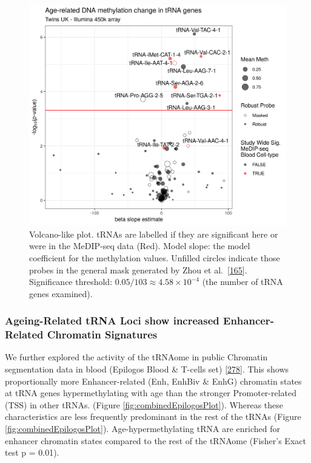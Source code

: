 \documentclass[
]{book}
\begin{document}
\begin{figure}

{\centering \includegraphics[width=1\linewidth]{./figs/blood_epitwins450k_Counts_sws_bl_zhou} 

}

\caption{Volcano-like plot. tRNAs are labelled if they are significant here or were in the MeDIP-seq data (Red). Model slope: the model coefficient for the methylation values. Unfilled circles indicate those probes in the general mask generated by Zhou et al.~{[}\protect\hyperlink{ref-Zhou2017}{165}{]}. Significance threshold: \(0.05/103 \approx 4.58\times10^{-4}\) (the number of tRNA genes examined).}\label{fig:bloodEpitwins450kCounts}
\end{figure}



\hypertarget{ageing-related-trna-loci-show-increased-enhancer-related-chromatin-signatures}{%
\subsubsection{Ageing-Related tRNA Loci show increased Enhancer-Related Chromatin Signatures}\label{ageing-related-trna-loci-show-increased-enhancer-related-chromatin-signatures}}

We further explored the activity of the tRNAome in public Chromatin segmentation data in blood (Epilogos Blood \& T-cells set) {[}\protect\hyperlink{ref-Meuleman2019}{278}{]}.
This shows proportionally more Enhancer-related (Enh, EnhBiv \& EnhG) chromatin states at tRNA genes hypermethylating with age than the stronger Promoter-related (TSS) in other tRNAs. (Figure \ref{fig:combinedEpilogosPlot}).
Whereas these characteristics are less frequently predominant in the rest of the tRNAs (Figure \ref{fig:combinedEpilogosPlot}).
Age-hypermethylating tRNA are enriched for enhancer chromatin states compared to the rest of the tRNAome (Fisher's Exact test p = 0.01).
\end{document}
